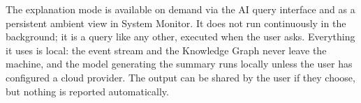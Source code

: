 The explanation mode is available on demand via the AI query interface and as
a persistent ambient view in System Monitor. It does not run continuously in
the background; it is a query like any other, executed when the user asks.
Everything it uses is local: the event stream and the Knowledge Graph never
leave the machine, and the model generating the summary runs locally unless
the user has configured a cloud provider. The output can be shared by the user
if they choose, but nothing is reported automatically.
